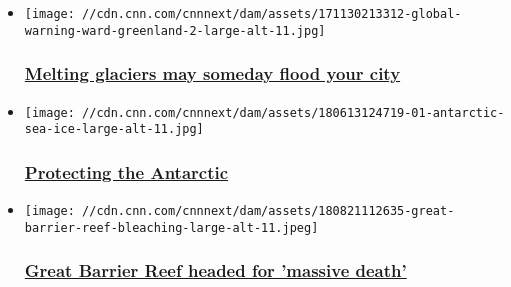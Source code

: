 \begin{itemize}
\item
  \href{https://www.cnn.com/interactive/2017/11/world/greenland-global-warning/}{}

  \texttt{[image: //cdn.cnn.com/cnnnext/dam/assets/171130213312-global-warning-ward-greenland-2-large-alt-11.jpg]}

  \hypertarget{melting-glaciers-may-someday-flood-your-city}{%
  \subsubsection{\texorpdfstring{\href{https://www.cnn.com/interactive/2017/11/world/greenland-global-warning/}{Melting
  glaciers may someday flood your
  city}}{Melting glaciers may someday flood your city}}\label{melting-glaciers-may-someday-flood-your-city}}
\end{itemize}

\begin{itemize}
\item
  \href{https://www.cnn.com/interactive/2018/06/world/antarctica/}{}

  \texttt{[image: //cdn.cnn.com/cnnnext/dam/assets/180613124719-01-antarctic-sea-ice-large-alt-11.jpg]}

  \hypertarget{protecting-the-antarctic}{%
  \subsubsection{\texorpdfstring{\href{https://www.cnn.com/interactive/2018/06/world/antarctica/}{Protecting
  the
  Antarctic}}{Protecting the Antarctic}}\label{protecting-the-antarctic}}
\end{itemize}

\begin{itemize}
\item
  \href{https://www.cnn.com/interactive/2018/08/world/great-barrier-reef/}{}

  \texttt{[image: //cdn.cnn.com/cnnnext/dam/assets/180821112635-great-barrier-reef-bleaching-large-alt-11.jpeg]}

  \hypertarget{great-barrier-reef-headed-for-massive-death}{%
  \subsubsection{\texorpdfstring{\href{https://www.cnn.com/interactive/2018/08/world/great-barrier-reef/}{Great
  Barrier Reef headed for 'massive
  death'}}{Great Barrier Reef headed for 'massive death'}}\label{great-barrier-reef-headed-for-massive-death}}
\end{itemize}

